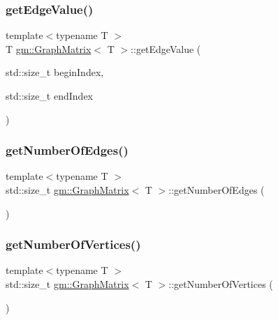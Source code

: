 \mbox{\label{classgm_1_1_graph_matrix_a57fbb70b98bfdd89400afaaac7af20ec}} 
\subsubsection{\texorpdfstring{get\+Edge\+Value()}{getEdgeValue()}}
{\footnotesize\ttfamily template$<$typename T $>$ \\
T \mbox{\hyperlink{classgm_1_1_graph_matrix}{gm\+::\+Graph\+Matrix}}$<$ T $>$\+::get\+Edge\+Value (\begin{DoxyParamCaption}\item[{std\+::size\+\_\+t}]{begin\+Index,  }\item[{std\+::size\+\_\+t}]{end\+Index }\end{DoxyParamCaption})}

\mbox{\label{classgm_1_1_graph_matrix_a4c240da5b6fb8ca0f0b65b179fcddf60}} 
\subsubsection{\texorpdfstring{get\+Number\+Of\+Edges()}{getNumberOfEdges()}}
{\footnotesize\ttfamily template$<$typename T $>$ \\
std\+::size\+\_\+t \mbox{\hyperlink{classgm_1_1_graph_matrix}{gm\+::\+Graph\+Matrix}}$<$ T $>$\+::get\+Number\+Of\+Edges (\begin{DoxyParamCaption}{ }\end{DoxyParamCaption})}

\mbox{\label{classgm_1_1_graph_matrix_a4efd9cd32511a16462cbbb22f9a5c37b}} 
\subsubsection{\texorpdfstring{get\+Number\+Of\+Vertices()}{getNumberOfVertices()}}
{\footnotesize\ttfamily template$<$typename T $>$ \\
std\+::size\+\_\+t \mbox{\hyperlink{classgm_1_1_graph_matrix}{gm\+::\+Graph\+Matrix}}$<$ T $>$\+::get\+Number\+Of\+Vertices (\begin{DoxyParamCaption}{ }\end{DoxyParamCaption})}

